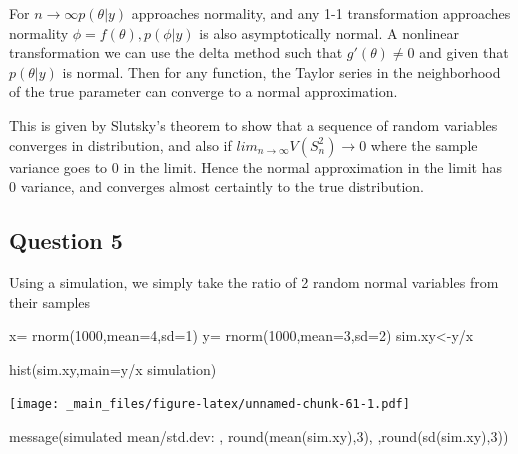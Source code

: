\documentclass[
]{book}
\newenvironment{Shaded}{\begin{snugshade}}{\end{snugshade}}
\newcommand{\AttributeTok}[1]{\textcolor[rgb]{0.77,0.63,0.00}{#1}}
\newcommand{\DecValTok}[1]{\textcolor[rgb]{0.00,0.00,0.81}{#1}}
\newcommand{\FunctionTok}[1]{\textcolor[rgb]{0.00,0.00,0.00}{#1}}
\newcommand{\NormalTok}[1]{#1}
\newcommand{\OtherTok}[1]{\textcolor[rgb]{0.56,0.35,0.01}{#1}}
\newcommand{\SpecialCharTok}[1]{\textcolor[rgb]{0.00,0.00,0.00}{#1}}
\newcommand{\StringTok}[1]{\textcolor[rgb]{0.31,0.60,0.02}{#1}}
\theoremstyle{definition}
\theoremstyle{definition}
\theoremstyle{definition}
\theoremstyle{definition}
\theoremstyle{remark}
\begin{document}
For \(n\to \infty p(\theta|y)\) approaches normality, and any 1-1 transformation approaches normality \(\phi=f(\theta), p(\phi|y)\) is also asymptotically normal. A nonlinear transformation we can use the delta method such that \(g'(\theta)\neq 0\) and given that \(p(\theta|y)\) is normal. Then for any function, the Taylor series in the neighborhood of the true parameter can converge to a normal approximation.

This is given by Slutsky's theorem to show that a sequence of random variables converges in distribution, and also if \(lim_{n\to \infty} V(S_n^2)\to 0\) where the sample variance goes to 0 in the limit. Hence the normal approximation in the limit has 0 variance, and converges almost certaintly to the true distribution.

\hypertarget{question-5-1}{%
\subsection*{Question 5}\label{question-5-1}}

Using a simulation, we simply take the ratio of 2 random normal variables from their samples

\begin{Shaded}
\begin{Highlighting}[]
\NormalTok{ x}\OtherTok{=} \FunctionTok{rnorm}\NormalTok{(}\DecValTok{1000}\NormalTok{,}\AttributeTok{mean=}\DecValTok{4}\NormalTok{,}\AttributeTok{sd=}\DecValTok{1}\NormalTok{)}
\NormalTok{ y}\OtherTok{=} \FunctionTok{rnorm}\NormalTok{(}\DecValTok{1000}\NormalTok{,}\AttributeTok{mean=}\DecValTok{3}\NormalTok{,}\AttributeTok{sd=}\DecValTok{2}\NormalTok{)}
\NormalTok{ sim.xy}\OtherTok{\textless{}{-}}\NormalTok{y}\SpecialCharTok{/}\NormalTok{x}
 
 \FunctionTok{hist}\NormalTok{(sim.xy,}\AttributeTok{main=}\StringTok{\textquotesingle{}y/x simulation\textquotesingle{}}\NormalTok{)}
\end{Highlighting}
\end{Shaded}

\texttt{[image: \_main\_files/figure-latex/unnamed-chunk-61-1.pdf]}

\begin{Shaded}
\begin{Highlighting}[]
 \FunctionTok{message}\NormalTok{(}\StringTok{\textquotesingle{}simulated mean/std.dev: \textquotesingle{}}\NormalTok{, }\FunctionTok{round}\NormalTok{(}\FunctionTok{mean}\NormalTok{(sim.xy),}\DecValTok{3}\NormalTok{),}\StringTok{\textquotesingle{} \textquotesingle{}}\NormalTok{,}\FunctionTok{round}\NormalTok{(}\FunctionTok{sd}\NormalTok{(sim.xy),}\DecValTok{3}\NormalTok{))}
\end{Highlighting}
\end{Shaded}
\end{document}
